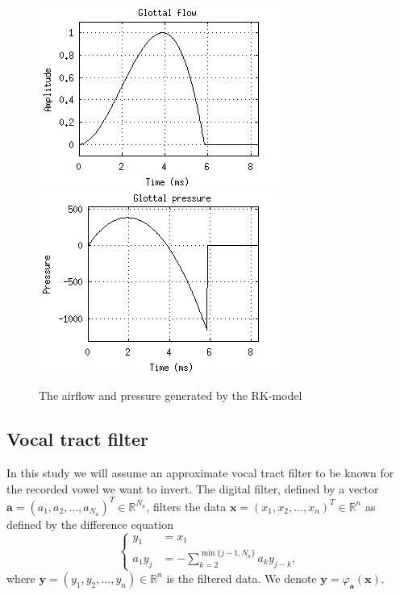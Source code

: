 \documentclass[12pt,a4]{article}
\newcommand{\R}{{\mathbb R}}
\newcommand{\vc}[1]{\ensuremath{\bm{#1}}}
\begin{document}
\begin{figure}[t]
\begin{center}
\includegraphics[scale=1]{img/klattflow.png}
\includegraphics[scale=1]{img/klattpres.png}
\end{center}
\caption{The airflow and pressure generated by the RK-model}
\label{fig:klatt}
\end{figure}


\subsection{Vocal tract filter}
\label{sec:filter}

In this study we will assume an approximate vocal tract filter to be known for the recorded vowel we want to invert. The digital filter, defined by a vector $\vc{a} = \left( a_1, a_2, \ldots , a_{N_a} \right)^T \in \R^{N_a}$, filters the data $\vc{x} = \left( x_1, x_2, \ldots , x_n \right)^T \in \R^n$ as defined by the difference equation
\begin{equation}
\left\{
\begin{alignedat}{1}
\label{eq:filter-diffeq}
y_1     &= x_1 \\
a_1 y_j &= -\sum_{k=2}^{\min\{j-1, N_a\}} a_{k} y_{j-k} ,
\end{alignedat}
\right.
\end{equation}
where $\vc{y} = \left( y_1, y_2, \ldots , y_n \right) \in \R^n$ is the filtered data. We denote $\vc{y} = \varphi_{\vc{a}} (\vc{x})$.
\end{document}
